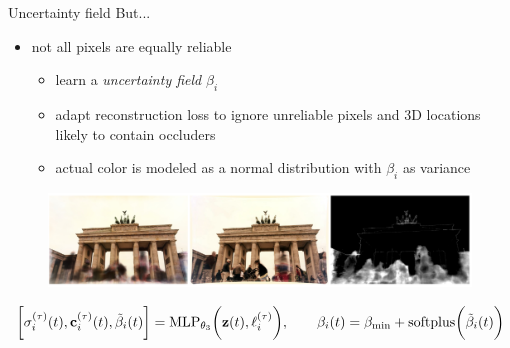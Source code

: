 \documentclass[aspectratio=1610]{beamer}
\newcommand{\parenth}[2][]{#1(#2#1)}
\begin{document}
\begin{frame}{Uncertainty field}
    But... 
    \pause
    \begin{itemize}
        \item not all pixels are equally reliable
        \begin{itemize}
            \item learn a \emph{uncertainty field} \(\beta_i\)
            \item adapt reconstruction loss to ignore unreliable pixels and 3D locations likely to contain occluders
            \item actual color is modeled as a normal distribution with \(\beta_i\) as variance
        \end{itemize}
    \end{itemize}
    \bigskip
    \pause
    \begin{figure}[H]
        \centering
        \includegraphics[width=.75\textwidth]{uncertainty.png}
    \end{figure}
    \bigskip
    \pause
    \begin{equation*}
        \bigg[\sigma_i^{(\tau)} (t), \vb{c}_i^{(\tau)} (t), \tilde{\beta}_i (t)\bigg] = \textrm{MLP}_{\theta_3} \parenth[\bigg]{\vb{z}(t), \ell_i^{(\tau)}},
        \quad\quad 
        \beta_i (t) = \beta_{\textrm{min}} + \textrm{softplus}\parenth[\bigg]{\tilde{\beta}_i (t)}
    \end{equation*}
\end{frame}
\end{document}
